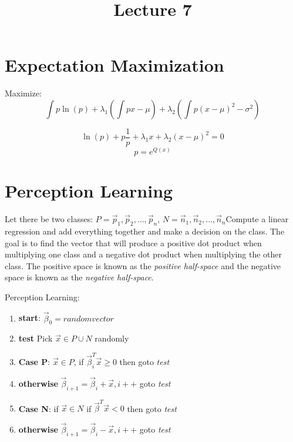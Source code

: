 \documentclass[letter, 9pt]{article}
\title{Lecture 7}
\begin{document}
\maketitle

\section{Expectation Maximization}
Maximize:
\begin{equation}
\int p \ln(p) + \lambda_1(\int px - \mu) + \lambda_2(\int p(x - \mu)^2 - \sigma^2)
\end{equation}

\begin{equation}
\ln(p) + p\frac{1}{p} + \lambda_1 x + \lambda_2(x - \mu)^2 = 0
\end{equation}
\begin{equation}
p = e^{Q(x)}
\end{equation}

\section{Perception Learning}

Let there be two classes: $P = \vec{p}_1, \vec{p}_2, \dots, \vec{p}_n$, $N = \vec{n}_1, \vec{n}_2, \dots, \vec{n}_n$Compute a linear regression and add everything together and make a decision on the class. The goal is to find the vector that will produce a positive dot product when multiplying one class and a negative dot product when multiplying the other class. The positive space is known as the \emph{positive half-space} and the negative space is known as the \emph{negative half-space}.

Perception Learning:
\begin{enumerate}
\item \textbf{start}: $\vec{\beta}_0 = random vector$
\item \textbf{test} Pick $\vec{x} \in P\cup N$ randomly
\item \textbf{Case P}: $\vec{x} \in P$, if $\vec{\beta}_i^T \vec{x} \geq 0$ then goto \emph{test}
\item \textbf{otherwise} $\vec{\beta}_{i+1} = \vec{\beta}_i + \vec{x}, i++$ goto \emph{test}
\item \textbf{Case N}: if $\vec{x} \in N$ if $\vec{\beta}^T \vec{x} < 0$ then goto \emph{test}
\item \textbf{otherwise} $\vec{\beta}_{i+1} = \vec{\beta}_i - \vec{x}, i++$ goto \emph{test}
\end{enumerate}
\end{document}
